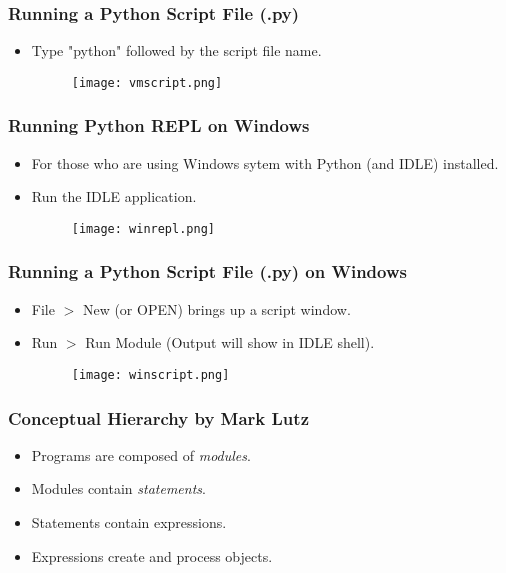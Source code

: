 \documentclass{beamer}
\begin{document}
\begin{frame}[fragile]
\frametitle{Running a Python Script File (.py)}
\begin{itemize}
\item Type "python" followed by the script file name.
\begin{figure}[h]
\texttt{[image: vmscript.png]}
\end{figure}
\end{itemize}
\end{frame}

\begin{frame}[fragile]
\frametitle{Running Python REPL on Windows}
\begin{itemize}
\item For those who are using Windows sytem
      with Python (and IDLE) installed.
\item Run the IDLE application.
\begin{figure}[h]
\texttt{[image: winrepl.png]}
\end{figure}
\end{itemize}
\end{frame}

\begin{frame}[fragile]
\frametitle{Running a Python Script File (.py) on Windows}
\begin{itemize}
\item File $>$ New (or OPEN) brings up a script window.
\item Run $>$ Run Module (Output will show in IDLE shell).
\begin{figure}[h]
\texttt{[image: winscript.png]}
\end{figure}
\end{itemize}
\end{frame}

\begin{frame}[fragile]
\frametitle{Conceptual Hierarchy by Mark Lutz\cite{Lutz2013}}
\begin{itemize}
\item<1-> Programs are composed of \emph{modules}.
\item<1-> Modules contain \emph{statements}.
\item<2-> Statements contain expressions.
\item<2-> Expressions create and process objects.
\end{itemize}
\end{frame}
\end{document}

